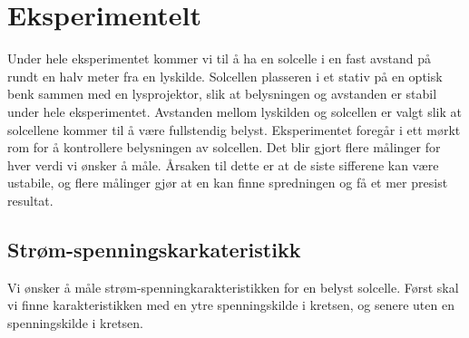 \documentclass[%
 reprint,
 amsmath,amssymb,
 aps,
 norsk,
 booktabs
]{revtex4-1}
\begin{document}
\section{Eksperimentelt}
Under hele eksperimentet kommer vi til å ha en solcelle i en fast avstand på rundt en halv meter fra en lyskilde. Solcellen plasseren i et stativ på en optisk benk sammen med en lysprojektor, slik at belysningen og avstanden er stabil under hele eksperimentet. Avstanden mellom lyskilden og solcellen er valgt slik at solcellene kommer til å være fullstendig belyst. Eksperimentet foregår i ett mørkt rom for å kontrollere belysningen av solcellen. Det blir gjort flere målinger for hver verdi vi ønsker å måle. Årsaken til dette er at de siste sifferene kan være ustabile, og flere målinger gjør at en kan finne spredningen og få et mer presist resultat.\\
\subsection{Strøm-spenningskarkateristikk}
Vi ønsker å måle strøm-spenningkarakteristikken for en belyst solcelle. Først skal vi finne karakteristikken med en ytre spenningskilde i kretsen, og senere uten en spenningskilde i kretsen.
\end{document}
